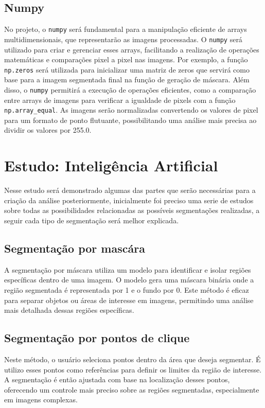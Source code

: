 \subsection{Numpy}
No projeto, o \texttt{numpy} será fundamental para a manipulação eficiente de arrays multidimensionais, que representarão as imagens processadas. O \texttt{numpy} será utilizado para criar e gerenciar esses arrays, facilitando a realização de operações matemáticas e comparações pixel a pixel nas imagens. Por exemplo, a função \texttt{np.zeros} será utilizada para inicializar uma matriz de zeros que servirá como base para a imagem segmentada final na função de geração de máscara. Além disso, o \texttt{numpy} permitirá a execução de operações eficientes, como a comparação entre arrays de imagens para verificar a igualdade de pixels com a função \texttt{np.array\_equal}. As imagens serão normalizadas convertendo os valores de pixel para um formato de ponto flutuante, possibilitando uma análise mais precisa ao dividir os valores por 255.0.

\section{Estudo: Inteligência Artificial}
Nesse estudo será demonstrado algumas das partes que serão necessárias para a criação da análise posteriormente, 
inicialmente foi preciso uma serie de estudos sobre todas as possibilidades relacionadas as possíveis segmentações realizadas, 
a seguir cada tipo de segmentação será melhor explicada.

\subsection{Segmentação por mascára}
A segmentação por máscara utiliza um modelo para identificar e isolar regiões específicas dentro de uma imagem. 
O modelo gera uma máscara binária onde a região segmentada é representada por 1 e o fundo por 0.
 Este método é eficaz para separar objetos ou áreas de interesse em imagens, permitindo uma análise mais detalhada dessas regiões específicas.

\subsection{Segmentação por pontos de clique}
Neste método, o usuário seleciona pontos dentro da área que deseja segmentar.
É utilizo esses pontos como referências para definir os limites da região de interesse.
 A segmentação é então ajustada com base na localização desses pontos, oferecendo um controle mais preciso sobre as regiões segmentadas, especialmente em imagens complexas.

